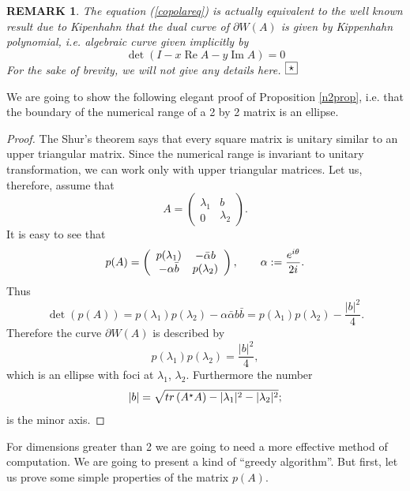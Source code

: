 \documentclass[10pt,a4paper,reqno]{amsart}
\newtheorem{rem}[defi]{\bf R\scriptsize EMARK \normalsize}
\def\kopr{\hfill\raisebox{3pt}{\framebox{$\star$}}}
\newenvironment{remark}{\begin{rem}\rm}{$\kopr$\end{rem}}
\newcommand{\nadsebou}[2]{\begin{array}{c} #1 \\ #2 \end{array}}
\newcommand{\zav}[1]{\left( #1 \right)}
\newcommand{\imag}{{\rm i}}
\renewcommand\Re{\operatorname{Re}}
\renewcommand\Im{\operatorname{Im}}
\newcommand{\deter}[1]{\det\zav{#1}}
\newcommand{\tr}{{\rm tr}\,}
\begin{document}

\begin{remark}
The equation (\ref{copolareq}) is actually equivalent to the well known result due to Kipenhahn \cite{Kippenhahnorig,Kippenhahn} that the dual curve of $\partial W(A)$ is given by Kippenhahn polynomial, i.e. algebraic curve given implicitly by
$$
\deter{I-x\Re A-y\Im A}=0
$$
For the sake of brevity, we will not give any details here.
\end{remark}
We are going to show the following elegant proof of Proposition \ref{n2prop}, i.e. that the boundary of the numerical range of a 2 by 2 matrix is an ellipse.
\begin{proof}
The Shur's theorem says that every square matrix is unitary similar to an upper triangular matrix. Since the numerical range is invariant to unitary transformation,  we can work only with upper triangular matrices. Let us, therefore, assume that 
$$
A=\zav{\nadsebou{\lambda_1}{0}\nadsebou{b}{\lambda_2}}.
$$  
It is easy to see that
$$
p(A)=\zav{\nadsebou{p(\lambda_1)}{-\alpha \bar b}\nadsebou{-\bar \alpha b}{p(\lambda_2)}},\qquad \alpha:=\frac{e^{\imag \theta}}{2\imag}.
$$
Thus
$$
\deter{p(A)}=p(\lambda_1)p(\lambda_2)-\alpha\bar\alpha b\bar b=p(\lambda_1)p(\lambda_2)-\frac{|b|^2}{4}.
$$
Therefore the curve $\partial W(A)$ is described by
$$
p(\lambda_1)p(\lambda_2)=\frac{|b|^2}{4},
$$
which is an ellipse with foci at $\lambda_1$, $\lambda_2$. Furthermore the number 
$$
|b|=\sqrt{\tr (A^\star A) -|\lambda_1|^2-|\lambda_2|^2};
$$ is the minor axis.
\end{proof}
For dimensions greater than 2 we are going to need a more effective method of computation. We are going to present a kind of ``greedy algorithm''.
But first, let us prove some simple properties of the matrix $p(A)$.
\end{document}
